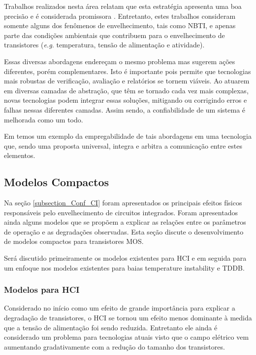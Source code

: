 Trabalhos realizados nesta área relatam que esta estratégia apresenta uma boa precisão e é considerada promissora \cite{Baranowski2015}. Entretanto, estes trabalhos consideram somente alguns dos fenômenos de envelhecimento, tais como NBTI, e apenas parte das condições ambientais que contribuem para o envelhecimento de transistores (\textit{e.g.} temperatura, tensão de alimentação e atividade).

Essas diversas abordagens endereçam o mesmo problema mas sugerem ações diferentes, porém complementares. Isto é importante pois permite que tecnologias mais robustas de verificação, avaliação e relatórios se tornem viáveis. Ao atuarem em diversas camadas de abstração, que têm se tornado cada vez mais complexas, novas tecnologias podem integrar essas soluções, mitigando ou corrigindo erros e falhas nessas diferentes camadas. Assim sendo, a confiabilidade de um sistema é melhorada como um todo.

Em \cite{Maeda2014} temos um exemplo da empregabilidade de tais abordagens em uma tecnologia que, sendo uma proposta universal, integra e arbitra a comunicação entre estes elementos. 

\subsection{Modelos Compactos}
\label{subsection_modelos_compactos}

Na seção \ref{subsection_Conf_CI} foram apresentados os principais efeitos físicos responsáveis pelo envelhecimento de circuitos integrados. Foram apresentados ainda alguns modelos que se propõem a explicar as relações entre os parâmetros de operação e as degradações observadas. Esta seção discute o desenvolvimento de modelos compactos para transistores MOS.

Será discutido primeiramente os modelos existentes para HCI e em seguida para um enfoque nos modelos existentes para baias temperature instability e TDDB.
	
\subsubsection{Modelos para HCI}
\label{subsubsection_Modelos_HCI}

Considerado no início como um efeito de grande importância para explicar a degradação de transistores, o HCI se tornou um efeito menos dominante à medida que a tensão de alimentação foi sendo reduzida. Entretanto ele ainda é considerado um problema para tecnologias atuais visto que o campo elétrico vem aumentando gradativamente com a redução do tamanho dos transistores.


